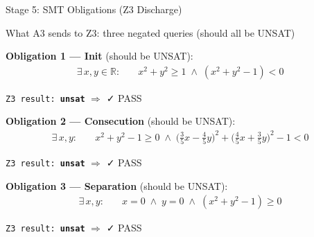 \documentclass[aspectratio=169]{beamer}
\begin{document}
\begin{frame}[fragile]{Stage 5: SMT Obligations (Z3 Discharge)}
\begin{block}{What A3 sends to Z3: three negated queries (should all be UNSAT)}
\end{block}

\vspace{0.3em}
\footnotesize
\textbf{Obligation 1 --- Init} (should be UNSAT):
\begin{align*}
  \exists\, x, y \in \mathbb{R}:\quad
  & x^2 + y^2 \ge 1 \;\wedge\; (x^2 + y^2 - 1) < 0
\end{align*}
\begin{center}
\texttt{Z3 result: \textcolor{safe}{\textbf{unsat}}} \quad $\Rightarrow$ \textcolor{safe}{\faCheck\; PASS}
\end{center}

\vspace{0.3em}
\textbf{Obligation 2 --- Consecution} (should be UNSAT):
\begin{align*}
  \exists\, x, y:\quad
  & x^2 + y^2 - 1 \ge 0 \;\wedge\;
    \bigl(\tfrac{3}{5}x - \tfrac{4}{5}y\bigr)^2 + \bigl(\tfrac{4}{5}x + \tfrac{3}{5}y\bigr)^2 - 1 < 0
\end{align*}
\begin{center}
\texttt{Z3 result: \textcolor{safe}{\textbf{unsat}}} \quad $\Rightarrow$ \textcolor{safe}{\faCheck\; PASS}
\end{center}

\vspace{0.3em}
\textbf{Obligation 3 --- Separation} (should be UNSAT):
\begin{align*}
  \exists\, x, y:\quad
  & x = 0 \;\wedge\; y = 0 \;\wedge\; (x^2 + y^2 - 1) \ge 0
\end{align*}
\begin{center}
\texttt{Z3 result: \textcolor{safe}{\textbf{unsat}}} \quad $\Rightarrow$ \textcolor{safe}{\faCheck\; PASS}
\end{center}
\end{frame}
\end{document}
